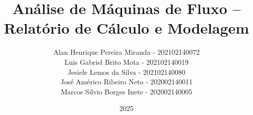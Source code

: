 \documentclass[oneside]{PPGEI-tex}
\begin{document}
    \title{Análise de Máquinas de Fluxo -- Relatório de Cálculo e Modelagem}
    \author{Alan Henrique Pereira Miranda - 202102140072\\
    Luis Gabriel Brito Mota - 202102140019\\
    Jesiele Lemos da Silva - 202102140080\\
    José Américo Ribeiro Neto - 202002140011\\
    Marcos Silvio Borges Inete - 202002140005}
    \coorientador{}
    \date{2025}

    \criarcapa
    \criarcontracapa

%    
%    
%    
%    
%    
    
    \newpage

    \tableofcontents
    \newpage
    \listoffigures
    \newpage
    \listoftables
    \newpage


    
    
    
    
    

    \newpage
    

    \newpage
    \appendix
    
\end{document}
